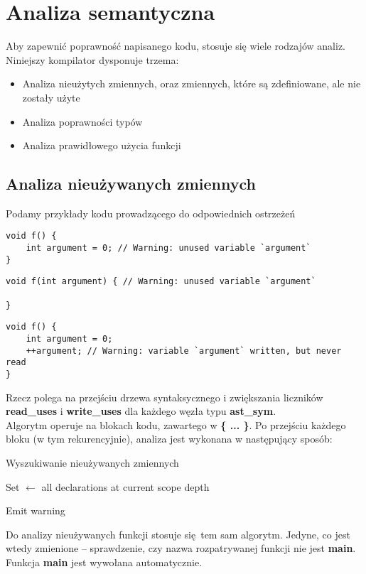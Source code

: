 \section{Analiza semantyczna}

	Aby zapewnić poprawność napisanego kodu, stosuje się wiele rodzajów analiz. Niniejszy kompilator
	dysponuje trzema:
		
	\begin{itemize}
		\item Analiza nieużytych zmiennych, oraz zmiennych, które są zdefiniowane, ale nie zostały użyte
		\item Analiza poprawności typów
		\item Analiza prawidłowego użycia funkcji
	\end{itemize}
	
	\subsection{Analiza nieużywanych zmiennych}
		
		Podamy przykłady kodu prowadzącego do odpowiednich ostrzeżeń
		
		\spacing

\begin{lstlisting}[label={lst:warn-unused-var}]
void f() {
	int argument = 0; // Warning: unused variable `argument`
}
\end{lstlisting}

\begin{lstlisting}[label={lst:warn-unused-var}]
void f(int argument) { // Warning: unused variable `argument`

}
\end{lstlisting}
			
\begin{lstlisting}[label={lst:warn-unused-var}]
void f() {
	int argument = 0;
	++argument; // Warning: variable `argument` written, but never read
}
\end{lstlisting}

	\spacing
	
	Rzecz polega na przejściu drzewa syntaksycznego i zwiększania liczników
	\textbf{read_uses} i \textbf{write_uses} dla każdego węzła typu
	\textbf{ast_sym}.
	\\
	
	Algorytm operuje na blokach kodu, zawartego w \textbf{\{ ... \}}. Po przejściu każdego bloku
	(w tym rekurencyjnie), analiza jest wykonana w następujący sposób:

	\begin{algorithm}
		\caption{Wyszukiwanie nieużywanych zmiennych}
		\begin{algorithmic}[1]

			\State Set $\gets$ all declarations at current scope depth

					\State Emit warning
				\EndIf
			\EndFor
		\EndProcedure

		\end{algorithmic}
	\end{algorithm}

	Do analizy nieużywanych funkcji stosuje się tem sam algorytm. Jedyne, co jest wtedy zmienione --
	sprawdzenie, czy nazwa rozpatrywanej funkcji nie jest \textbf{main}. Funkcja \textbf{main} jest
	wywołana automatycznie.
